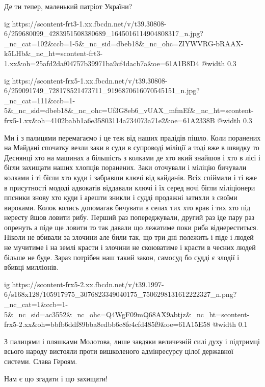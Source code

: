 Де ти тепер, маленький патріот України?

\ifcmt
  ig https://scontent-frt3-1.xx.fbcdn.net/v/t39.30808-6/259680099_4283951508380689_1645016114904808317_n.jpg?_nc_cat=102&ccb=1-5&_nc_sid=dbeb18&_nc_ohc=ZlYWVRG-bRAAX-k5LHb&_nc_ht=scontent-frt3-1.xx&oh=25afd2daf04757b39971ba9cf4dacb7a&oe=61A1B8D4
  @width 0.3
\fi


\ifcmt
  ig https://scontent-frx5-1.xx.fbcdn.net/v/t39.30808-6/259091749_728178521473711_9196870616070545151_n.jpg?_nc_cat=111&ccb=1-5&_nc_sid=dbeb18&_nc_ohc=Uf3G8eb6_vUAX_mfmEf&_nc_ht=scontent-frx5-1.xx&oh=4102babb1a6e35803114a734073a71e2&oe=61A2338B
  @width 0.3
\fi


Ми і з палицями перемагаємо і це теж від наших прадідів пішло. Коли поранених
на Майдані спочатку везли заки в суди в супроводі міліції а тоді вже в швидку
то Деснянці хто на машинах а більшість з колками де хто який знайшов і хто в
лісі і бігли захищати наших хлопців поранених. Заки оточували і міліцію
бичували колками і ті бігли хто куди і забравши ключі від кайданів. Всіх
спіймали і ті вже в присутності мододі адвокатів віддавали ключі і їх серед
ночі бігли міліціонери ппсники знову хто куди і арешти зникли і судді продажні
затихли з своїми вироками. Колок колись допомагав бичувати в селах тих хто крав
і тих хто під нересту йшов ловити рибу. Перший раз попереджували, другий раз
іде пару раз опренуть а піде ще ловити то так давали що лежатиме поки риба
віднереститься. Ніколи не вбивали за злочини але били так, що три дні полежить
і піде і людей не мучитиме і на землі красти і злочини не скоюватиме і красти в
чесних людей більше не буде. Зараз потрібен наш такий закон, самосуд бо судді
є злодії і вбивці милліонів.


\ifcmt
  ig https://scontent-frx5-2.xx.fbcdn.net/v/t39.1997-6/s168x128/105917975_3076823349040175_7506298131612222327_n.png?_nc_cat=1&ccb=1-5&_nc_sid=ac3552&_nc_ohc=Q4WgF09mQ68AX9abtjz&_nc_ht=scontent-frx5-2.xx&oh=bbfb6ddf89bba8edbb6c8fe4cfd485f9&oe=61A15E58
  @width 0.1
\fi


З палицями і пляшками Молотова, лише завдяки величезній силі духу і підтримці
всього народу вистояли проти вишколеного адмінресурсу цілої державної
системи. Слава Героям.

Нам є що згадати і що захищати!

